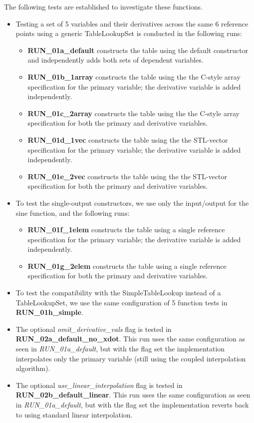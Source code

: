 \documentclass[11pt,fleqn]{report}
\begin{document}
The following tests are established to investigate these functions.
\begin{itemize}
  \item Testing a set of 5 variables and their derivatives across the same 6
  reference points using a generic TableLookupSet is conducted in the following
  runs:
  \begin{itemize}
    \item \textbf{RUN\_01a\_default} constructs the table using the default
      constructor and independently adds both sets of dependent variables.
    \item \textbf{RUN\_01b\_1array}  constructs the table using the the C-style
      array specification for the primary variable; the derivative variable
      is added independently.
    \item \textbf{RUN\_01c\_2array} constructs the table using the the C-style
      array specification for both the primary and derivative variables.
    \item \textbf{RUN\_01d\_1vec} constructs the table using the the STL-vector
      specification for the primary variable; the derivative variable is added
      independently.
    \item \textbf{RUN\_01e\_2vec} constructs the table using the the STL-vector
      specification for both the primary and derivative variables.
  \end{itemize}

  \item To test the single-output constructors, we use only the input/output
    for the sine function, and the following runs:
  \begin{itemize}
    \item \textbf{RUN\_01f\_1elem} constructs the table using a
      single reference specification for the primary variable; the derivative
      variable is added independently.
    \item \textbf{RUN\_01g\_2elem} constructs the table using a
      single reference specification for both the primary and derivative
      variables.
  \end{itemize}

  \item To test the compatibility with the SimpleTableLookup instead of a
      TableLookupSet, we use the same configuration of 5 function tests
      in \textbf{RUN\_01h\_simple}.
  \item The optional \textit{omit\_derivative\_vals} flag is tested in
    \textbf{RUN\_02a\_default\_no\_xdot}. This run uses the same configuration
    as seen in \textit{RUN\_01a\_default}, but with the flag set the
    implementation interpolates only the primary variable (still using the
    coupled interpolation algorithm).
  \item The optional \textit{use\_linear\_interpolation} flag is tested in
    \textbf{RUN\_02b\_default\_linear}. This run uses the same configuration
    as seen in \textit{RUN\_01a\_default}, but with the flag set the
    implementation reverts back to using standard linear interpolation.
\end{itemize}
\end{document}

